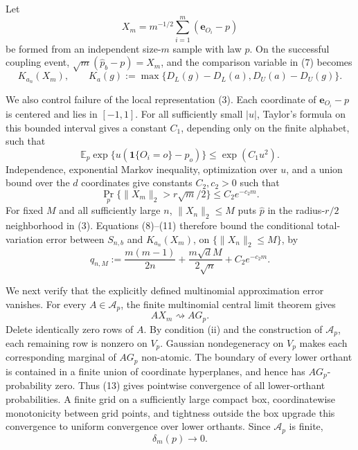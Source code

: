 Let
\[
X_m=m^{-1/2}\sum_{i=1}^m(\mathbf e_{O_i}-p)
\]
be formed from an independent size-\(m\) sample with law \(p\).  On the successful coupling event, \(\sqrt m(\widehat p_b-p)=X_m\), and the comparison variable in (7) becomes
\[
K_{a_n}(X_m),
\qquad
K_a(g):=\max\{D_L(g)-D_L(a),D_U(a)-D_U(g)\}.
\tag{10}
\]

We also control failure of the local representation (3).  Each coordinate of \(\mathbf e_{O_i}-p\) is centered and lies in \([-1,1]\).  For all sufficiently small \(|u|\), Taylor's formula on this bounded interval gives a constant \(C_1\), depending only on the finite alphabet, such that
\[
\mathbb E_p\exp\{u(\mathbf1\{O_i=o\}-p_o)\}\leq\exp(C_1u^2).
\]
Independence, exponential Markov inequality, optimization over \(u\), and a union bound over the \(d\) coordinates give constants \(C_2,c_2>0\) such that
\[
\Pr_p\{\|X_m\|_2>r\sqrt m/2\}\leq C_2e^{-c_2m}.
\tag{11}
\]
For fixed \(M\) and all sufficiently large \(n\), \(\|X_n\|_2\leq M\) puts \(\widehat p\) in the radius-\(r/2\) neighborhood in (3).  Equations (8)--(11) therefore bound the conditional total-variation error between \(S_{n,b}\) and \(K_{a_n}(X_m)\), on \(\{\|X_n\|_2\leq M\}\), by
\[
q_{n,M}:=\frac{m(m-1)}{2n}+\frac{m\sqrt d M}{2\sqrt n}+C_2e^{-c_2m}.
\tag{12}
\]

We next verify that the explicitly defined multinomial approximation error vanishes.  For every \(A\in\mathcal A_p\), the finite multinomial central limit theorem gives
\[
AX_m\rightsquigarrow AG_p.
\tag{13}
\]
Delete identically zero rows of \(A\).  By condition (ii) and the construction of \(\mathcal A_p\), each remaining row is nonzero on \(V_p\).  Gaussian nondegeneracy on \(V_p\) makes each corresponding marginal of \(AG_p\) non-atomic.  The boundary of every lower orthant is contained in a finite union of coordinate hyperplanes, and hence has \(AG_p\)-probability zero.  Thus (13) gives pointwise convergence of all lower-orthant probabilities.  A finite grid on a sufficiently large compact box, coordinatewise monotonicity between grid points, and tightness outside the box upgrade this convergence to uniform convergence over lower orthants.  Since \(\mathcal A_p\) is finite,
\[
\delta_m(p)\longrightarrow0.
\tag{14}
\]

